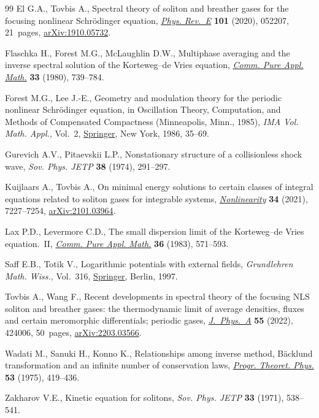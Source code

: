 \begin{thebibliography}{99}
El G.A., Tovbis A., Spectral theory of soliton and breather gases for the
 focusing nonlinear {S}chr\"odinger equation, \href{https://doi.org/10.1103/PhysRevE.101.052207}{\textit{Phys. Rev.~E}}
 \textbf{101} (2020), 052207, 21~pages, \href{https://arxiv.org/abs/1910.05732}{arXiv:1910.05732}.

Flaschka H., Forest M.G., McLaughlin D.W., Multiphase averaging and the inverse
 spectral solution of the {K}orteweg--de {V}ries equation, \href{https://doi.org/10.1002/cpa.3160330605}{\textit{Comm. Pure
 Appl. Math.}} \textbf{33} (1980), 739--784.

Forest M.G., Lee J.-E., Geometry and modulation theory for the periodic
 nonlinear {S}chr\"odinger equation, in Oscillation Theory, Computation, and
 Methods of Compensated Compactness ({M}inneapolis, {M}inn., 1985),
 \textit{IMA Vol. Math. Appl.}, Vol.~2, \href{https://doi.org/10.1007/978-1-4613-8689-6_3}{Springer}, New York, 1986, 35--69.

Gurevich A.V., Pitaevskii L.P., Nonstationary structure of a collisionless
 shock wave, \textit{Sov. Phys. JETP} \textbf{38} (1974), 291--297.

Kuijlaars A., Tovbis A., On minimal energy solutions to certain classes of
 integral equations related to soliton gases for integrable systems,
 \href{https://doi.org/10.1088/1361-6544/ac20a5}{\textit{Nonlinearity}} \textbf{34} (2021), 7227--7254, \href{https://arxiv.org/abs/2101.03964}{arXiv:2101.03964}.

Lax P.D., Levermore C.D., The small dispersion limit of the {K}orteweg--de
 {V}ries equation.~{II}, \href{https://doi.org/10.1002/cpa.3160360503}{\textit{Comm. Pure Appl. Math.}} \textbf{36} (1983),
 571--593.

Saff E.B., Totik V., Logarithmic potentials with external fields,
 \textit{Grundlehren Math. Wiss.}, Vol.~316, \href{https://doi.org/10.1007/978-3-662-03329-6}{Springer}, Berlin, 1997.

Tovbis A., Wang F., Recent developments in spectral theory of the focusing
 {NLS} soliton and breather gases: the thermodynamic limit of average
 densities, fluxes and certain meromorphic differentials; periodic gases,
 \href{https://doi.org/10.1088/1751-8121/ac97d0}{\textit{J.~Phys.~A}} \textbf{55} (2022), 424006, 50~pages,
 \href{https://arxiv.org/abs/2203.03566}{arXiv:2203.03566}.

Wadati M., Sanuki H., Konno K., Relationships among inverse method,
 {B}\"acklund transformation and an infinite number of conservation laws,
 \href{https://doi.org/10.1143/PTP.53.419}{\textit{Progr. Theoret. Phys.}} \textbf{53} (1975), 419--436.

Zakharov V.E., Kinetic equation for solitons, \textit{Sov. Phys. JETP}
 \textbf{33} (1971), 538--541.

\end{thebibliography}\LastPageEnding
